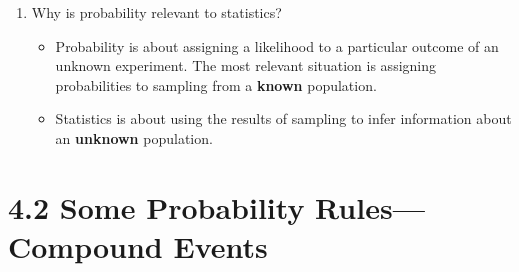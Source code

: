 \documentclass{article}
\begin{document}
\begin{enumerate}
\begin{itemize}
        \end{itemize}
        
    \item Why is probability relevant to statistics?
    
        \begin{itemize}
        
            \item Probability is about assigning a likelihood to a particular outcome of an unknown experiment. The most relevant situation is assigning probabilities to sampling from a \textbf{known} population.
            
            \item Statistics is about using the results of sampling to infer information about an \textbf{unknown} population.
            
        \end{itemize}
    
\end{enumerate}

\newpage

\section*{4.2 Some Probability Rules---Compound Events}
\end{document}
